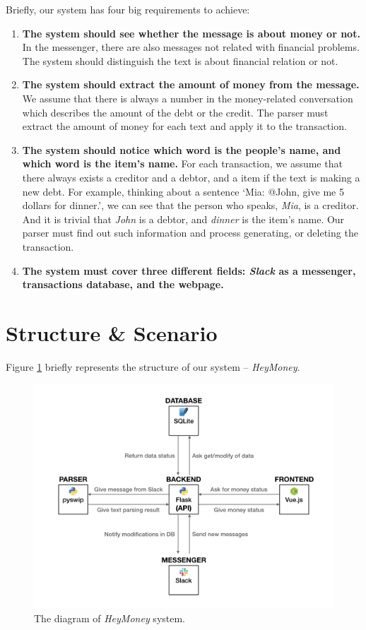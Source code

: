 \documentclass[11pt]{article}
\begin{document}
Briefly, our system has four big requirements to achieve:

\begin{enumerate}
  \item \textbf{The system should see whether the message is about money or not.}
  In the messenger, there are also messages not related with financial problems.
  The system should distinguish the text is about financial relation or not.
  \item \textbf{The system should extract the amount of money from the message.}
  We assume that there is always a number in the money-related conversation
  which describes the amount of the debt or the credit.
  The parser must extract the amount of money for each text
  and apply it to the transaction.
  \item \textbf{The system should notice which word is the people's name,
  and which word is the item's name.}
  For each transaction, we assume that there always exists
  a creditor and a debtor, and a item if the text is making a new debt.
  For example, thinking about a sentence
  `Mia: @John, give me 5 dollars for dinner.',
  we can see that the person who speaks, \textit{Mia}, is a creditor.
  And it is trivial that \textit{John} is a debtor, and \textit{dinner}
  is the item's name.
  Our parser must find out such information and process generating, or deleting
  the transaction.
  \item \textbf{The system must cover three different fields:
  \textit{Slack} as a messenger, transactions database, and the webpage.}
\end{enumerate}

\section{Structure \& Scenario}

Figure \ref{fig:diagram} briefly represents the structure of our system -- \textit{HeyMoney}.

\begin{figure}[!htbp]
  \centering
  \includegraphics[width=\textwidth]{images/cl-hw3-diagram.png}
  \caption{The diagram of \textit{HeyMoney} system.}
  \label{fig:diagram}
\end{figure}
\end{document}
